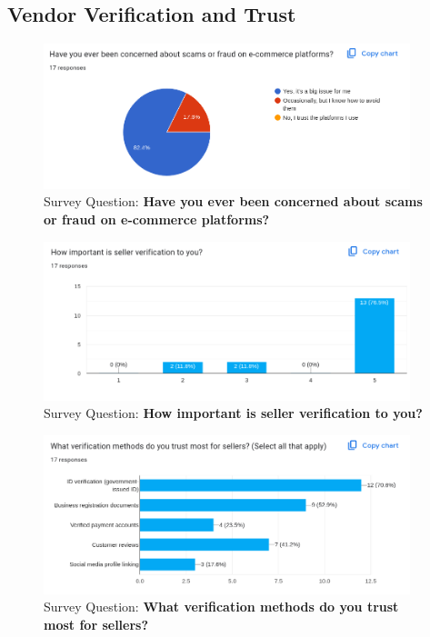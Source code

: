 \documentclass[12pt]{report}
\begin{document}
\begin{appendices}
	\section{Vendor Verification and Trust}

	\begin{figure}[H]
		\begin{center}
			\includegraphics[width=0.95\textwidth]{survey/q12}
		\end{center}
		\caption{Survey Question: \textbf{Have you ever been concerned about scams or fraud on e-commerce platforms?}}
	\end{figure}

	\begin{figure}[H]
		\begin{center}
			\includegraphics[width=0.95\textwidth]{survey/q13}
		\end{center}
		\caption{Survey Question: \textbf{How important is seller verification to you?}}
	\end{figure}

	\begin{figure}[H]
		\begin{center}
			\includegraphics[width=0.95\textwidth]{survey/q14}
		\end{center}
		\caption{Survey Question: \textbf{What verification methods do you trust most for sellers? }}
	\end{figure}


\end{appendices}
\end{document}
